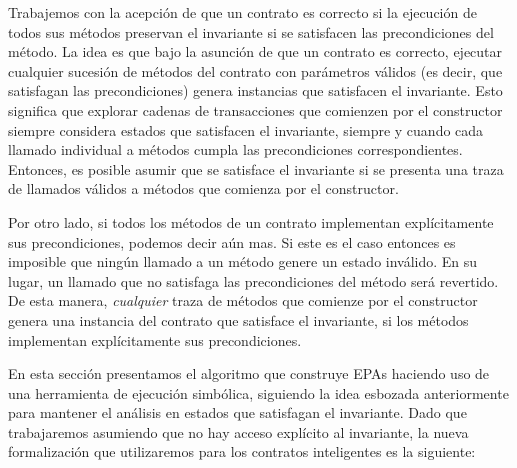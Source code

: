 Trabajemos con la acepción de que un contrato es correcto si la ejecución de todos sus métodos preservan el invariante si se satisfacen las precondiciones del método.
La idea es que bajo la asunción de que un contrato es correcto, ejecutar cualquier sucesión de métodos del contrato con parámetros válidos (es decir, que satisfagan las precondiciones) genera instancias que satisfacen el invariante.
Esto significa que explorar cadenas de transacciones que comienzen por el constructor siempre considera estados que satisfacen el invariante, siempre y cuando cada llamado individual a métodos cumpla las precondiciones correspondientes.
Entonces, es posible asumir que se satisface el invariante si se presenta una traza de llamados válidos a métodos que comienza por el constructor.

Por otro lado, si todos los métodos de un contrato implementan explícitamente sus precondiciones, podemos decir aún mas.
Si este es el caso entonces es imposible que ningún llamado a un método genere un estado inválido.
En su lugar, un llamado que no satisfaga las precondiciones del método será revertido.
De esta manera, \textit{cualquier} traza de métodos que comienze por el constructor genera una instancia del contrato que satisface el invariante, si los métodos implementan explícitamente sus precondiciones.

En esta sección presentamos el algoritmo que construye EPAs haciendo uso de una herramienta de ejecución simbólica, siguiendo la idea esbozada anteriormente para mantener el análisis en estados que satisfagan el invariante.
Dado que trabajaremos asumiendo que no hay acceso explícito al invariante, la nueva formalización que utilizaremos para los contratos inteligentes es la siguiente:

